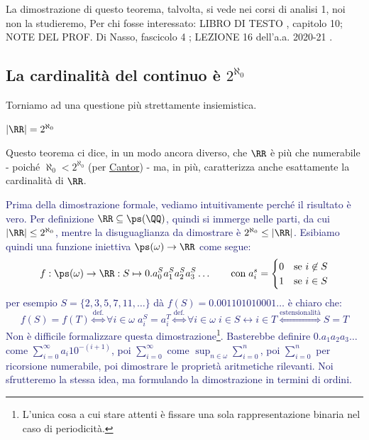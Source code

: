 La dimostrazione di questo teorema, talvolta, si vede nei corsi di analisi 1, noi non la studieremo, Per chi fosse interessato: LIBRO DI TESTO \cite{jech}, capitolo 10; NOTE DEL PROF. Di Nasso, 
fascicolo 4 \cite{diNasso_eti_2019_20}; LEZIONE 16 dell'a.a. 2020-21 \cite{mamino_eti_20_21}.

\subsection{\texorpdfstring{La cardinalità del continuo è $2^{\aleph_0}$}{2 alla aleph-zero}}
Torniamo ad una questione più strettamente insiemistica.

\begin{theorem}
	$|\RR| = 2^{\aleph_0}$
\end{theorem}

Questo teorema ci dice, in un modo ancora diverso, che $\RR$ è più che numerabile - poiché $\aleph_0 < 2^{\aleph_0}$ (per \hyperref[cantor]{Cantor}) - ma, in più, caratterizza
anche esattamente la cardinalità di $\RR$.

\textcolor{MidnightBlue}{Prima della dimostrazione formale, vediamo intuitivamente perché il risultato è vero. Per definizione $\RR \subseteq \ps(\QQ)$, quindi si immerge nelle parti, da cui
$|\RR| \leq 2^{\aleph_0}$, mentre la disuguaglianza da dimostrare è $2^{\aleph_0} \leq |\RR|$.
Esibiamo quindi una funzione iniettiva $\ps(\omega) \rightarrow \RR$ come segue:
\[ f : \ps(\omega) \rightarrow \RR : S \mapsto 0.a_0^Sa_1^Sa_2^Sa_3^S\ldots \qquad \text{con} \; a_i^s = \begin{cases}
	0 &\text{\text{se $i \not\in S$}} \\
	1 &\text{\text{se $i \in S$}}
\end{cases}
	\]
per esempio $S = \{2,3,5,7,11,\ldots\}$ dà $f(S) = 0.001101010001\ldots$ è chiaro che:
\[ f(S) = f(T) \overset{\text{def.}}{\iff} \forall i \in \omega \; a_i^S = a_i^T \overset{\text{def.}}{\iff} \forall i \in \omega \; i \in S \leftrightarrow i \in T \overset{\text{estensionalità}}{\iff} S = T
	\]
Non è difficile formalizzare questa dimostrazione\footnote{L'unica cosa a cui stare attenti è fissare una sola rappresentazione binaria nel caso di periodicità.}. Basterebbe definire $0.a_1a_2a_3\ldots$ come $\sum_{i = 0}^\infty a_i 10^{-(i + 1)}$, poi $\sum_{i = 0}^\infty$
come $\sup_{n \in \omega}\sum_{i = 0}^n$, poi $\sum_{i = 0}^n$ per ricorsione numerabile, poi dimostrare le proprietà aritmetiche rilevanti. Noi sfrutteremo la stessa idea, 
ma formulando la dimostrazione in termini di ordini.}

